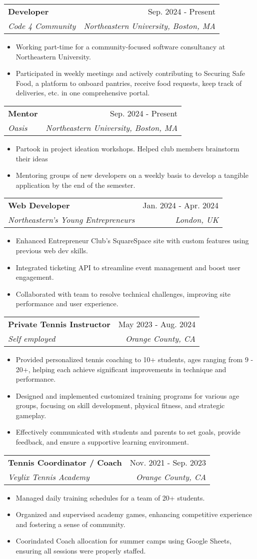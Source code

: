 \documentclass[letterpaper,11pt]{article}
\makeatletter
\newcommand{\resumeItem}[1]{
  \item\small{
    {#1 \vspace{-2pt}}
  }
}
\newcommand{\resumeSubheading}[4]{
  \vspace{-2pt}\item
    \begin{tabular*}{0.97\textwidth}[t]{l@{\extracolsep{\fill}}r}
      \textbf{#1} & #2 \\
      \textit{\small#3} & \textit{\small #4} \\
     
    \end{tabular*}\vspace{-7pt}
}
\newcommand{\resumeItemListStart}{\begin{itemize}}
\newcommand{\resumeItemListEnd}{\end{itemize}\vspace{-5pt}}
\makeatother
\begin{document}
       \resumeSubheading
      {Developer}{Sep. 2024 - Present}
      {Code 4 Community}{Northeastern University, Boston, MA}
      \resumeItemListStart
        \resumeItem{Working part-time for a community-focused software consultancy at Northeastern University. }
        \resumeItem{Participated in weekly meetings and actively contributing to Securing Safe Food, a platform to onboard pantries, receive food requests, keep track of deliveries, etc. in one comprehensive portal.}
    \resumeItemListEnd

   \resumeSubheading
      {Mentor}{Sep. 2024 - Present}
      {Oasis}{Northeastern University, Boston, MA}
      \resumeItemListStart
        \resumeItem{Partook in project ideation workshops. Helped club members brainstorm their ideas}
        \resumeItem{Mentoring groups of new developers on a weekly basis to develop a tangible application by the end of the semester.}
    \resumeItemListEnd
  
 \resumeSubheading
      {Web Developer}{Jan. 2024 - Apr. 2024}
      {Northeastern's Young Entrepreneurs}{London, UK}
      \resumeItemListStart
        \resumeItem{Enhanced Entrepreneur Club's SquareSpace site with custom features using previous web dev skills.}
        \resumeItem{Integrated ticketing API to streamline event management and boost user engagement.}
        \resumeItem{Collaborated with team to resolve technical challenges, improving site performance and user experience.}
    \resumeItemListEnd

     \resumeSubheading
      {Private Tennis Instructor}{May 2023 - Aug. 2024}
      {Self employed}{Orange County, CA}
      \resumeItemListStart
        \resumeItem{Provided personalized tennis coaching to 10+ students, ages ranging from 9 - 20+, helping each achieve significant improvements in technique and performance.}
        \resumeItem{Designed and implemented customized training programs for various age groups, focusing on skill development, physical fitness, and strategic gameplay.}
        \resumeItem{Effectively communicated with students and parents to set goals, provide feedback, and ensure a supportive learning environment.}
    \resumeItemListEnd

     \resumeSubheading
      {Tennis Coordinator / Coach}{Nov. 2021 - Sep. 2023}
      {Veylix Tennis Academy}{Orange County, CA}
      \resumeItemListStart
        \resumeItem{Managed daily training schedules for a team of 20+ students.}
        \resumeItem{Organized and supervised academy games, enhancing competitive experience and fostering a sense of community.}
        \resumeItem{Coorindated Coach allocation for summer camps using Google Sheets, ensuring all sessions were properly staffed.}
    \resumeItemListEnd
\end{document}
